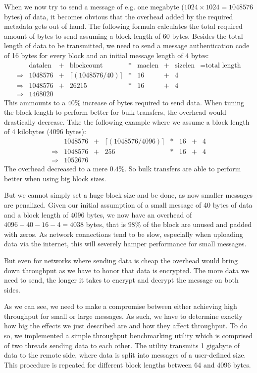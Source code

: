 When we now try to send a message of e.g. one megabyte ($1024 \times 1024 = 1048576$ bytes) of data, it becomes obvious that the overhead added by the required metadata gets out of hand.
The following formula calculates the total required amount of bytes to send assuming a block length of 60 bytes.
Besides the total length of data to be transmitted, we need to send a message authentication code of 16 bytes for every block and an initial message length of 4 bytes:
\begin{align*}
    &\text{datalen} &+ &\text{blockcount} &* &\text{maclen} &+ &\text{sizelen} &= \text{total length}\\
    \Rightarrow &1048576 &+ & \lceil(1048576 / 40)\rceil &* &16 &+ &4\\
    \Rightarrow &1048576 &+ & 26215 &* &16 &+ &4\\
    \Rightarrow &1468020
\end{align*}
This ammounts to a $40\%$ increase of bytes required to send data.
When tuning the block length to perform better for bulk transfers, the overhead would drastically decrease.
Take the following example where we assume a block length of 4 kilobytes (4096 bytes):
\begin{align*}
    &1048576 &+ &\lceil(1048576 / 4096)\rceil &* &16 &+ &4\\
    \Rightarrow &1048576 &+ &256 &* &16 &+ &4\\
    \Rightarrow &1052676
\end{align*}
The overhead decreased to a mere $0.4\%$.
So bulk transfers are able to perform better when using big block sizes.

But we cannot simply set a huge block size and be done, as now smaller messages are penalized.
Given our initial assumption of a small message of 40 bytes of data and a block length of 4096 bytes, we now have an overhead of $4096 - 40 - 16 - 4 = 4038$ bytes, that is $98\%$ of the block are unused and padded with zeros.
As network connections tend to be slow, especially when uploading data via the internet, this will severely hamper performance for small messages.

But even for networks where sending data is cheap the overhead would bring down throughput as we have to honor that data is encrypted.
The more data we need to send, the longer it takes to encrypt and decrypt the message on both sides.

\medskip

As we can see, we need to make a compromise between either achieving high throughput for small or large messages.
As such, we have to determine exactly how big the effects we just described are and how they affect throughput.
To do so, we implemented a simple throughput benchmarking utility which is comprised of two threads sending data to each other.
The utility transmits 1 gigabyte of data to the remote side, where data is split into messages of a user-defined size.
This procedure is repeated for different block lengths between 64 and 4096 bytes.

